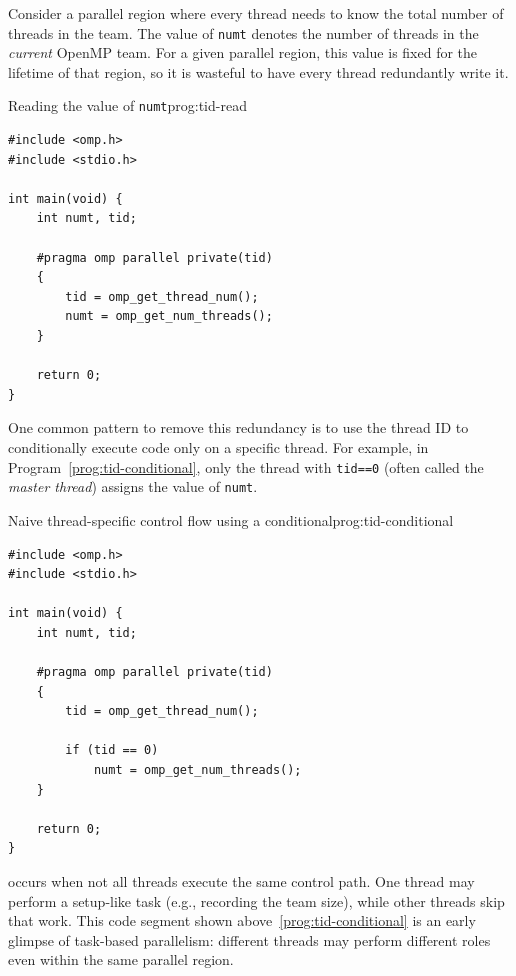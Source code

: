 Consider a parallel region where every thread needs to know the total number of threads in the team.
The value of \texttt{numt} denotes the number of threads in the \emph{current} OpenMP team.
 For a given parallel region, this value is fixed for the lifetime of that region, so it is wasteful to have every thread redundantly write it. 
\begin{ppprogram}{Reading the value of \texttt{numt}}{prog:tid-read}
\begin{lstlisting}[language=OpenMP]
#include <omp.h>
#include <stdio.h>

int main(void) {
    int numt, tid;

    #pragma omp parallel private(tid)
    {
        tid = omp_get_thread_num();
        numt = omp_get_num_threads();
    }

    return 0;
}
\end{lstlisting}
\end{ppprogram}
One common pattern to remove this redundancy is to use the thread ID to conditionally execute code only on a specific thread.
For example, in Program~\ref{prog:tid-conditional}, only the thread with \texttt{tid==0} (often called the \emph{master thread}) assigns the value of \texttt{numt}.

\begin{ppprogram}{Naive thread-specific control flow using a conditional}{prog:tid-conditional}
\begin{lstlisting}[language=OpenMP]
#include <omp.h>
#include <stdio.h>

int main(void) {
    int numt, tid;

    #pragma omp parallel private(tid)
    {
        tid = omp_get_thread_num();

        if (tid == 0)
            numt = omp_get_num_threads();
    }

    return 0;
}
\end{lstlisting}
\end{ppprogram}

\begin{ppdefn}
 occurs when not all threads execute the same control path.
One thread may perform a setup-like task (e.g., recording the team size), while other threads skip that work.
This code segment shown above~\ref{prog:tid-conditional} is an early glimpse of task-based parallelism: different threads may perform different roles even within the same parallel region.
\end{ppdefn}

